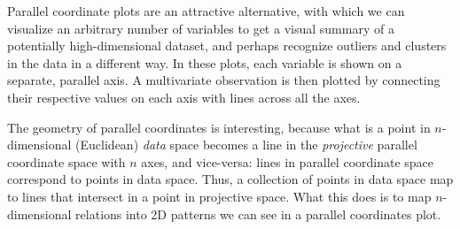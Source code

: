\documentclass[
  letterpaper,
  10pt,
  krantz2]{krantz}
\begin{document}
Parallel coordinate plots are an attractive alternative, with which we
can visualize an arbitrary number of variables to get a visual summary
of a potentially high-dimensional dataset, and perhaps recognize
outliers and clusters in the data in a different way. In these plots,
each variable is shown on a separate, parallel axis. A multivariate
observation is then plotted by connecting their respective values on
each axis with lines across all the axes.

The geometry of parallel coordinates is interesting, because what is a
point in \(n\)-dimensional (Euclidean) \emph{data} space becomes a line
in the \emph{projective} parallel coordinate space with \(n\) axes, and
vice-versa: lines in parallel coordinate space correspond to points in
data space. Thus, a collection of points in data space map to lines that
intersect in a point in projective space. What this does is to map
\(n\)-dimensional relations into 2D patterns we can see in a parallel
coordinates plot.
\end{document}
